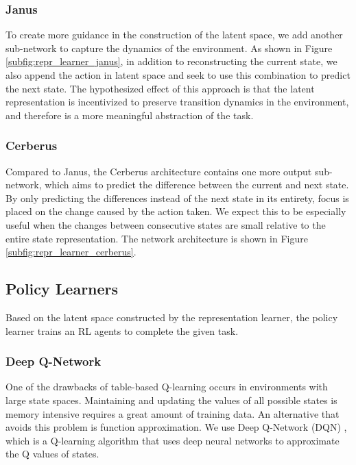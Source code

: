 \subsubsection{Janus}
To create more guidance in the construction of the latent space, we add another sub-network to capture the dynamics of the environment. 
As shown in Figure \ref{subfig:repr_learner_janus},
in addition to reconstructing the current state, we also append the action in latent space and seek to use this combination to predict the next state.
The hypothesized effect of this approach is that the latent representation is incentivized to preserve transition dynamics in the environment, and therefore is a more meaningful abstraction of the task.

\subsubsection{Cerberus}
Compared to Janus, the Cerberus architecture contains one more output sub-network, which aims to predict the difference between the current and next state. 
By only predicting the differences instead of the next state in its entirety, focus is placed on the change caused by the action taken.
We expect this to be especially useful when the changes between consecutive states are small relative to the entire state representation.
The network architecture is shown in Figure \ref{subfig:repr_learner_cerberus}.  

\subsection{Policy Learners}
Based on the latent space constructed by the representation learner, the policy learner trains an RL agents to complete the given task.


\subsubsection{Deep Q-Network}
One of the drawbacks of table-based Q-learning occurs in environments with large state spaces.
Maintaining and updating the values of all possible states is memory intensive requires a great amount of training data.
An alternative that avoids this problem is function approximation. 
We use Deep Q-Network (DQN) \citep{DQN}, which is a Q-learning algorithm that uses deep neural networks to approximate the Q values of states.

